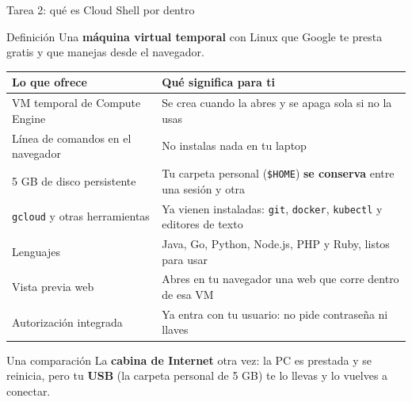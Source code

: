 \documentclass[aspectratio=169,10pt,c]{beamer}
\begin{document}
\begin{frame}{Tarea 2: qué es Cloud Shell por dentro}
\begin{block}{Definición}
\small Una \textbf{máquina virtual temporal} con Linux que Google te presta gratis y que manejas desde el navegador.
\end{block}
\renewcommand{\arraystretch}{1.22}
\centering\footnotesize
\begin{tabular}{@{}p{4.6cm}p{8.6cm}@{}}
\toprule
\textbf{Lo que ofrece} & \textbf{Qué significa para ti}\\
\midrule
VM temporal de Compute Engine & Se crea cuando la abres y se apaga sola si no la usas\\
Línea de comandos en el navegador & No instalas nada en tu laptop\\
5 GB de disco persistente & Tu carpeta personal (\texttt{\$HOME}) \textbf{se conserva} entre una sesión y otra\\
\texttt{gcloud} y otras herramientas & Ya vienen instaladas: \texttt{git}, \texttt{docker}, \texttt{kubectl} y editores de texto\\
Lenguajes & Java, Go, Python, Node.js, PHP y Ruby, listos para usar\\
Vista previa web & Abres en tu navegador una web que corre dentro de esa VM\\
Autorización integrada & Ya entra con tu usuario: no pide contraseña ni llaves\\
\bottomrule
\end{tabular}
\par\vspace{2mm}
\begin{exampleblock}{Una comparación}
\small La \textbf{cabina de Internet} otra vez: la PC es prestada y se reinicia, pero tu \textbf{USB} (la carpeta personal de 5 GB) te lo llevas y lo vuelves a conectar.
\end{exampleblock}
\end{frame}
\end{document}
